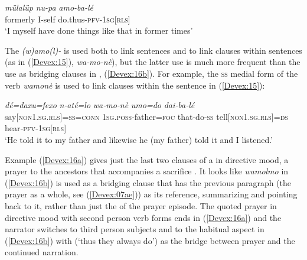 \documentclass[output=paper]{LSP/langsci}
\begin{document}
\begin{exe}
\ex \label{Devex:14}
\gll \textit{mülalüp} \textit{nu-pa} \textit{amo-ba-lé}\\
formerly I-self do.thus-\textsc{pfv-1sg[rls]}\\
\glt `I myself have done things like that in former times'\\      	
\end{exe}

The  \textit{(w)amo(l)-} is used both to link sentences and to link clauses within sentences (as in (\ref{Devex:15}), \textit{wa‑mo-nè}), but the latter use is much more frequent than the use as bridging clauses in , (\ref{Devex:16b}). For example, the \textsc{ss} medial form of the verb \textit{wamonè} is used to link clauses within the sentence in (\ref{Devex:15}):


\begin{exe}
\ex \label{Devex:15}	     
\gll \textit{dé=daxu=fexo} \textit{n‑até=lo} \textit{wa‑mo-nè} \textit{umo=do} \textit{dai‑ba‑lé}\\
say[\textsc{non1.sg.rls}]=\textsc{ss=conn} \textsc{1sg.poss}‑father=\textsc{foc} that-do-\textsc{ss}  		tell[\textsc{non1.sg.rls}]=\textsc{ds} hear‑\textsc{pfv‑1sg[rls]}\\
\glt `He told it to my father and likewise he (my father) told it and I listened.'\\	     
\end{exe}
	     
Example (\ref{Devex:16a}) gives just the last two clauses of a  in directive mood, a prayer to the ancestors that accompanies a sacrifice \citep[see examples (8)-(22)][160--162]{enk97}. It looks like \textit{wamolmo} in (\ref{Devex:16b}) is used as a bridging clause that has the previous paragraph (the prayer as a whole, see (\ref{Devex:07ae})) as its reference, summarizing and pointing back to it, rather than just the  of the prayer episode. The quoted prayer in directive mood with second person verb forms ends in (\ref{Devex:16a}) and the narrator switches to third person subjects and to the habitual aspect in (\ref{Devex:16b}) with  (`thus they always do') as the bridge between prayer and the continued narration.
	     
\end{document}
